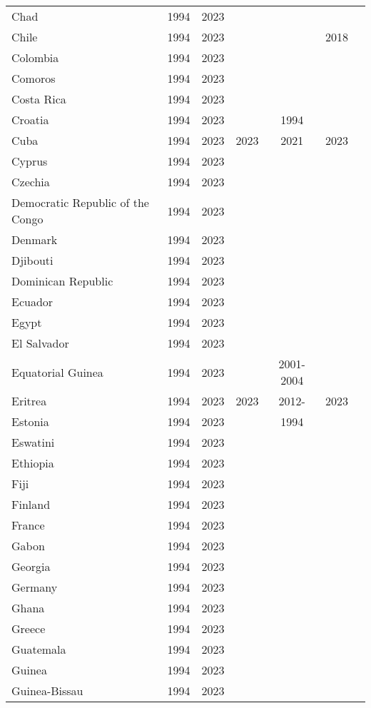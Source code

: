 {\begin{longtable}{lcccccc}
Chad & 1994 & 2023 &  &  &  & \\
\addlinespace
Chile & 1994 & 2023 &  &  & 2018 & \\
Colombia & 1994 & 2023 &  &  &  & \\
Comoros & 1994 & 2023 &  &  &  & \\
Costa Rica & 1994 & 2023 &  &  &  & \\
Croatia & 1994 & 2023 &  & 1994 &  & \\
\addlinespace
Cuba & 1994 & 2023 & 2023 & 2021 & 2023 & \\
Cyprus & 1994 & 2023 &  &  &  & \\
Czechia & 1994 & 2023 &  &  &  & \\
Democratic Republic of the Congo & 1994 & 2023 &  &  &  & \\
Denmark & 1994 & 2023 &  &  &  & \\
\addlinespace
Djibouti & 1994 & 2023 &  &  &  & \\
Dominican Republic & 1994 & 2023 &  &  &  & \\
Ecuador & 1994 & 2023 &  &  &  & \\
Egypt & 1994 & 2023 &  &  &  & \\
El Salvador & 1994 & 2023 &  &  &  & \\
\addlinespace
Equatorial Guinea & 1994 & 2023 &  & 2001-2004 &  & \\
Eritrea & 1994 & 2023 & 2023 & 2012- & 2023 & \\
Estonia & 1994 & 2023 &  & 1994 &  & \\
Eswatini & 1994 & 2023 &  &  &  & \\
Ethiopia & 1994 & 2023 &  &  &  & \\
\addlinespace
Fiji & 1994 & 2023 &  &  &  & \\
Finland & 1994 & 2023 &  &  &  & \\
France & 1994 & 2023 &  &  &  & \\
Gabon & 1994 & 2023 &  &  &  & \\
Georgia & 1994 & 2023 &  &  &  & \\
\addlinespace
Germany & 1994 & 2023 &  &  &  & \\
Ghana & 1994 & 2023 &  &  &  & \\
Greece & 1994 & 2023 &  &  &  & \\
Guatemala & 1994 & 2023 &  &  &  & \\
Guinea & 1994 & 2023 &  &  &  & \\
\addlinespace
Guinea-Bissau & 1994 & 2023 &  &  &  & \\

\end{longtable}}
